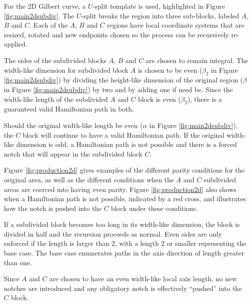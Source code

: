 For the 2D Gilbert curve, a $U$-split template is used, highlighted in Figure \ref{fig:main2dsubdiv}.
The $U$-split breaks the region into three sub-blocks, labeled $A$, $B$ and $C$.
Each of the $A$, $B$ and $C$ regions have local coordinate systems that are resized, rotated and
new endpoints chosen so the process can be recursively re-applied.

The sides of the subdivided blocks $A$, $B$ and $C$ are chosen to remain integral.
The width-like dimension for subdivided block $A$ is chosen to be even ($\beta_2$ in Figure \ref{fig:main2dsubdiv})
by dividing the height-like dimension of the original region ($\beta$ in Figure \ref{fig:main2dsubdiv}) by two and by adding one if need be.
Since the width-like length of the subdivided $A$ and $C$ block is even ($\beta_2$), there is a guaranteed valid Hamiltonian path 
in both.

Should the original width-like length be even ($\alpha$ in Figure \ref{fig:main2dsubdiv}), the $C$ block will continue to have 
a valid Hamiltonian path.
If the original width-like dimension is odd, a Hamiltonian path is not possible and there is a forced notch that will appear in the subdivided block $C$.

Figure \ref{fig:production2d} gives examples of the different parity conditions for the original area,
as well as the different conditions when the $A$ and $C$ subdivided areas are coerced into having even parity.
Figure \ref{fig:production2d} also shows when a Hamiltonian
path is not possible, indicated by a red cross, and illustrates how the notch is pushed into the $C$ block
under these conditions.

If a subdivided block becomes too long in its width-like dimension, the block is divided in half and the recursion
proceeds as normal.
Even sides are only enforced if the length is larger than 2, with a length 2 or smaller representing the base
case.
The base case enumerates paths in the axis direction of length greater than one.

Since $A$ and $C$ are chosen to have an even width-like local axis length, no new notches are introduced and any
obligatory notch is effectively ``pushed'' into the $C$ block.




